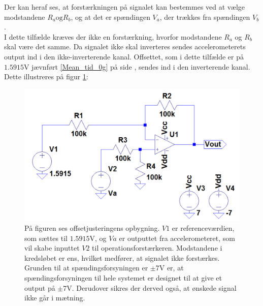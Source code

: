 \noindent Der kan heraf ses, at forstærkningen på signalet kan bestemmes ved at vælge modstandene $R_a \text{og} R_b$, og at det er spændingen $V_{a}$, der trækkes fra spændingen $V_{b}$. \\
I dette tilfælde kræves der ikke en forstærkning, hvorfor modstandene $R_{a}$ og $R_{b}$ skal være det samme. Da signalet ikke skal inverteres sendes accelerometerets output ind i den ikke-inverterende kanal. Offsettet, som i dette tilfælde er på $1.5915$V jævnført \ref{Mean_tid_0g} på side \pageref{Mean_tid_0g}, sendes ind i den inverterende kanal. Dette illustreres på figur \ref{fig:Offset_generisk}:
\begin{figure}[H]
\centering
\includegraphics[scale=0.45]{figures/cProblemloesning/Offset_generisk.png}
\caption{På figuren ses offsetjusteringens opbygning. $V1$ er referenceværdien, som sættes til $1.5915$V, og $Va$ er outputtet fra accelerometeret, som vil skabe inputtet $V2$ til operationsforstærkeren. Modstandene i kredsløbet er ens, hvilket medfører, at signalet ikke forstærkes. Grunden til at spændingsforsyningen er $\pm7$V er, at spændingsforsyningen til hele systemet er designet til at give et output på $\pm7$V. Derudover sikres der derved også, at ønskede signal ikke går i mætning.}
\label{fig:Offset_generisk}
\end{figure}

